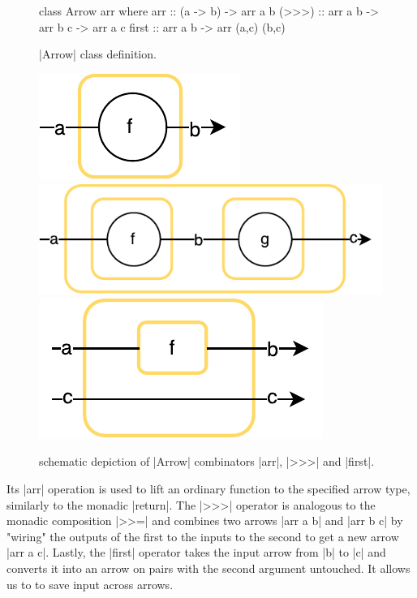 \begin{figure}[t]
\centering
\parbox[c][17em]{0.49\linewidth}{%
\begin{center}
\vfill
\begin{code}
class Arrow arr where
  arr :: (a -> b) -> arr a b
  (>>>) :: arr a b -> arr b c -> arr a c
  first :: arr a b -> arr (a,c) (b,c)
\end{code}
\vfill
\end{center}
\caption{|Arrow| class definition.}
\label{fig:ArrowDefinition}
}
\parbox[c][17em]{0.49\linewidth}{%
\vfill
\centering
	{\includegraphics[scale=0.6]{images/arr}}
	{\includegraphics[scale=0.6]{images/compose}}
	{\includegraphics[scale=0.6]{images/first}}
\vfill
\caption{schematic depiction of |Arrow| combinators |arr|, |>>>| and |first|.}
}
\end{figure}
Its |arr| operation is used to lift an ordinary function to the specified arrow type, similarly to the monadic |return|. The |>>>| operator is analogous to the monadic composition  |>>=| and combines two arrows |arr a b| and |arr b c| by "wiring" the outputs of the first to the inputs to the second to get a new arrow |arr a c|. Lastly, the |first| operator  takes the input arrow from |b| to |c| and converts it into an arrow on pairs with the second argument untouched. It allows us to to save input across arrows.
